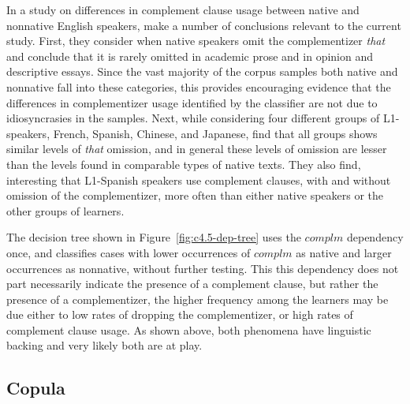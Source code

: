 \documentclass[main.tex]{subfiles}
\begin{document}
In a study on differences in complement clause usage between native and nonnative English speakers, \citet{biber:1998} make a number of conclusions relevant to the current study. First, they consider when native speakers omit the complementizer \textit{that} and conclude that it is rarely omitted in academic prose and in opinion and descriptive essays. Since the vast majority of the corpus samples both native and nonnative fall into these categories, this provides encouraging evidence that the differences in complementizer usage identified by the classifier are not due to idiosyncrasies in the samples. Next, while considering four different groups of L1-speakers, French, Spanish, Chinese, and Japanese, \citeauthor{biber:1998} find that all groups shows similar levels of \textit{that} omission, and in general these levels of omission are lesser than the levels found in comparable types of native texts. They also find, interesting that L1-Spanish speakers use complement clauses, with and without omission of the complementizer, more often than either native speakers or the other groups of learners.

The decision tree shown in Figure~\ref{fig:c4.5-dep-tree} uses the $complm$ dependency once, and classifies cases with lower occurrences of $complm$ as native and larger occurrences as nonnative, without further testing. This this dependency does not part necessarily indicate the presence of a complement clause, but rather the presence of a complementizer, the higher frequency among the learners may be due either to low rates of dropping the complementizer, or high rates of complement clause usage. As shown above, both phenomena have linguistic backing and very likely both are at play. 


\begin{figure}
\end{figure}

\subsection{Copula}
\end{document}
